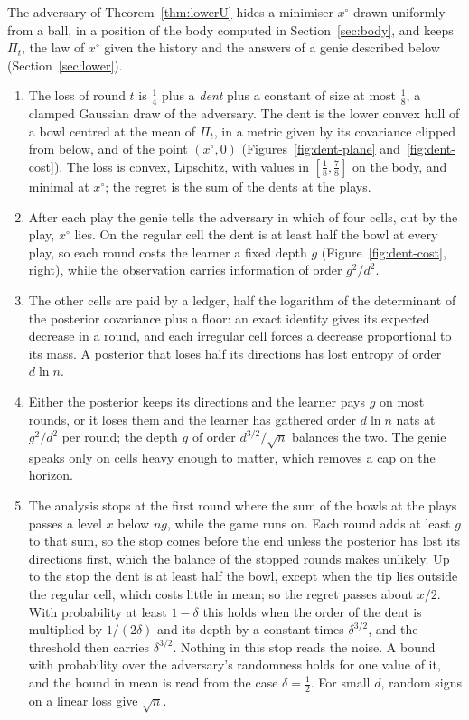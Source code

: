 \documentclass[11pt]{amsart}
\theoremstyle{definition}
\numberwithin{equation}{section}
\begin{document}
The adversary of Theorem~\ref{thm:lowerU} hides a minimiser $x^\circ$ drawn uniformly from a ball, in a position of the body computed in Section~\ref{sec:body}, and keeps $\Pi_t$, the law of $x^\circ$ given the history and the answers of a genie described below (Section~\ref{sec:lower}).
\begin{enumerate}[label=(\arabic*)]
\item The loss of round $t$ is $\frac14$ plus a \emph{dent} plus a constant of size at most $\frac18$, a clamped Gaussian draw of the adversary. The dent is the lower convex hull of a bowl centred at the mean of $\Pi_t$, in a metric given by its covariance clipped from below, and of the point $(x^\circ,0)$ (Figures~\ref{fig:dent-plane} and~\ref{fig:dent-cost}). The loss is convex, Lipschitz, with values in $[\frac18,\frac78]$ on the body, and minimal at $x^\circ$; the regret is the sum of the dents at the plays.
\item After each play the genie tells the adversary in which of four cells, cut by the play, $x^\circ$ lies. On the regular cell the dent is at least half the bowl at every play, so each round costs the learner a fixed depth $g$ (Figure~\ref{fig:dent-cost}, right), while the observation carries information of order $g^2/d^2$.
\item The other cells are paid by a ledger, half the logarithm of the determinant of the posterior covariance plus a floor: an exact identity gives its expected decrease in a round, and each irregular cell forces a decrease proportional to its mass. A posterior that loses half its directions has lost entropy of order $d\ln n$.
\item Either the posterior keeps its directions and the learner pays $g$ on most rounds, or it loses them and the learner has gathered order $d\ln n$ nats at $g^2/d^2$ per round; the depth $g$ of order $d^{3/2}/\sqrt n$ balances the two. The genie speaks only on cells heavy enough to matter, which removes a cap on the horizon.
\item The analysis stops at the first round where the sum of the bowls at the plays passes a level $x$ below $ng$, while the game runs on. Each round adds at least $g$ to that sum, so the stop comes before the end unless the posterior has lost its directions first, which the balance of the stopped rounds makes unlikely. Up to the stop the dent is at least half the bowl, except when the tip lies outside the regular cell, which costs little in mean; so the regret passes about $x/2$. With probability at least $1-\delta$ this holds when the order of the dent is multiplied by $1/(2\delta)$ and its depth by a constant times $\delta^{3/2}$, and the threshold then carries $\delta^{3/2}$. Nothing in this stop reads the noise. A bound with probability over the adversary's randomness holds for one value of it, and the bound in mean is read from the case $\delta=\frac12$. For small $d$, random signs on a linear loss give $\sqrt n$.
\end{enumerate}
\end{document}

